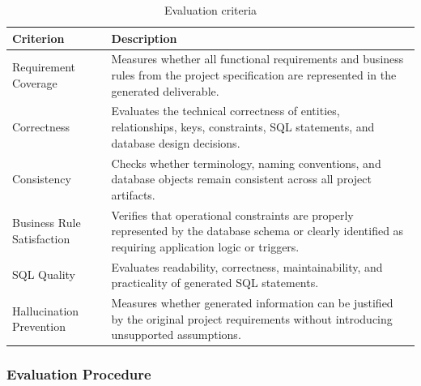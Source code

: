 \begin{table}[H]
	\centering
	\caption{Evaluation criteria}
	\label{tab:criteria}

	\begin{tabularx}{\linewidth}{>{\raggedright\arraybackslash}p{4cm}X}

		\toprule

		\textbf{Criterion}
		 &
		\textbf{Description}

		\\

		\midrule

		Requirement Coverage
		 &
		Measures whether all functional requirements and business rules from the project specification are represented in the generated deliverable.

		\\

		Correctness
		 &
		Evaluates the technical correctness of entities, relationships, keys, constraints, SQL statements, and database design decisions.

		\\

		Consistency
		 &
		Checks whether terminology, naming conventions, and database objects remain consistent across all project artifacts.

		\\

		Business Rule Satisfaction
		 &
		Verifies that operational constraints are properly represented by the database schema or clearly identified as requiring application logic or triggers.

		\\

		SQL Quality
		 &
		Evaluates readability, correctness, maintainability, and practicality of generated SQL statements.

		\\

		Hallucination Prevention
		 &
		Measures whether generated information can be justified by the original project requirements without introducing unsupported assumptions.

		\\

		\bottomrule
	\end{tabularx}

\end{table}

\subsubsection{Evaluation Procedure}

